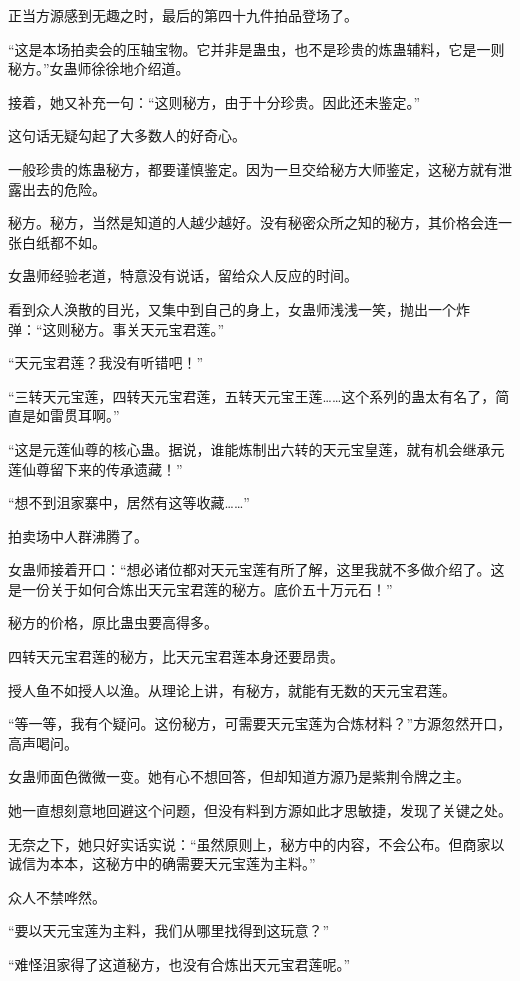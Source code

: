 \begin{this_body}
正当方源感到无趣之时，最后的第四十九件拍品登场了。

“这是本场拍卖会的压轴宝物。它并非是蛊虫，也不是珍贵的炼蛊辅料，它是一则秘方。”女蛊师徐徐地介绍道。

接着，她又补充一句：“这则秘方，由于十分珍贵。因此还未鉴定。”

这句话无疑勾起了大多数人的好奇心。

一般珍贵的炼蛊秘方，都要谨慎鉴定。因为一旦交给秘方大师鉴定，这秘方就有泄露出去的危险。

秘方。秘方，当然是知道的人越少越好。没有秘密众所之知的秘方，其价格会连一张白纸都不如。

女蛊师经验老道，特意没有说话，留给众人反应的时间。

看到众人涣散的目光，又集中到自己的身上，女蛊师浅浅一笑，抛出一个炸弹：“这则秘方。事关天元宝君莲。”

“天元宝君莲？我没有听错吧！”

“三转天元宝莲，四转天元宝君莲，五转天元宝王莲……这个系列的蛊太有名了，简直是如雷贯耳啊。”

“这是元莲仙尊的核心蛊。据说，谁能炼制出六转的天元宝皇莲，就有机会继承元莲仙尊留下来的传承遗藏！”

“想不到沮家寨中，居然有这等收藏……”

拍卖场中人群沸腾了。

女蛊师接着开口：“想必诸位都对天元宝莲有所了解，这里我就不多做介绍了。这是一份关于如何合炼出天元宝君莲的秘方。底价五十万元石！”

秘方的价格，原比蛊虫要高得多。

四转天元宝君莲的秘方，比天元宝君莲本身还要昂贵。

授人鱼不如授人以渔。从理论上讲，有秘方，就能有无数的天元宝君莲。

“等一等，我有个疑问。这份秘方，可需要天元宝莲为合炼材料？”方源忽然开口，高声喝问。

女蛊师面色微微一变。她有心不想回答，但却知道方源乃是紫荆令牌之主。

她一直想刻意地回避这个问题，但没有料到方源如此才思敏捷，发现了关键之处。

无奈之下，她只好实话实说：“虽然原则上，秘方中的内容，不会公布。但商家以诚信为本本，这秘方中的确需要天元宝莲为主料。”

众人不禁哗然。

“要以天元宝莲为主料，我们从哪里找得到这玩意？”

“难怪沮家得了这道秘方，也没有合炼出天元宝君莲呢。”


\end{this_body}

